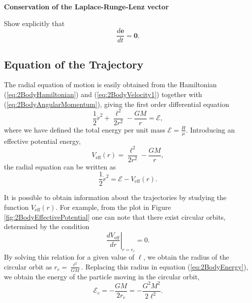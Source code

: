 \begin{exercise}
\textbf{Conservation of the Laplace-Runge-Lenz vector}

Show explicitly that
\begin{equation}
\frac{d \textbf{e}}{dt} = \textbf{0}.
\end{equation}
\end{exercise}

\subsection{Equation of the Trajectory}
The radial equation of motion is easily obtained from the Hamiltonian (\ref{eq:2BodyHamiltonian}) and (\ref{eq:2BodyVelocity1}) together with (\ref{eq:2BodyAngularMomentum}), giving the first order differential equation
\begin{equation}
\frac{1}{2} \dot{r}^2 + \frac{\ell^2}{2r^2}  - \frac{GM}{r} = \mathcal{E},\label{eq:2BodyEnergy}
\end{equation}
where we have defined the total energy per unit mass $\mathcal{E} = \frac{H}{\mu}$. Introducing an effective potential energy,
\begin{equation}
V_{\text{eff}} (r) = \frac{\ell^2}{2r^2}  - \frac{GM}{r},
\end{equation}
the radial equation can be written as 
\begin{equation}
\frac{1}{2} \dot{r}^2 = \mathcal{E} - V_{\text{eff}} (r). \label{eq:2BodyEoM1}
\end{equation}

It is possible to obtain information about the trajectories by studying  the function $V_{\text{eff}} (r)$. For example, from the plot in Figure \ref{fig:2BodyEffectivePotential} one can note that there exist circular orbits, determined by the condition
\begin{equation}
\left. \frac{dV_{\text{eff}}}{dr} \right|_{r=r_c} = 0.
\end{equation}
By solving this relation for a given value of $\ell$, we obtain the radius of the circular orbit as $r_c = \frac{\ell^2}{GM}$. Replacing this radius in equation (\ref{eq:2BodyEnergy}), we obtain the energy of the particle moving in the circular orbit,
\begin{equation}
\mathcal{E}_c = -\frac{GM}{2r_c} = -\frac{G^2 M^2}{2\ell^2}. 
\end{equation}

